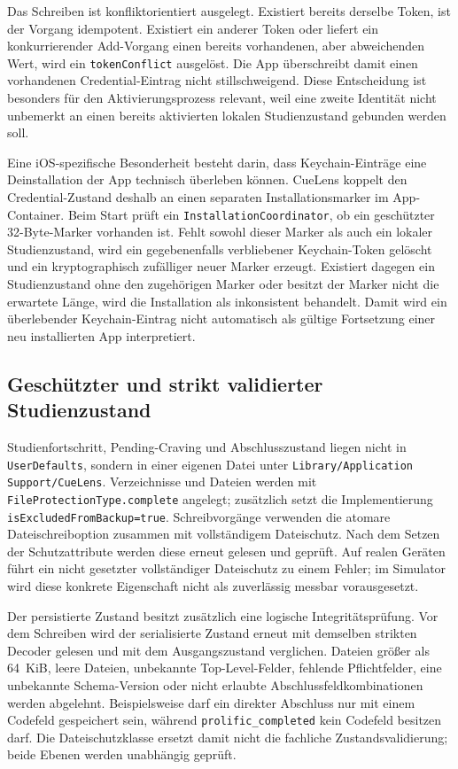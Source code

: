 \begin{neu}
Das Schreiben ist konfliktorientiert ausgelegt. Existiert bereits derselbe Token, ist der Vorgang idempotent. Existiert ein anderer Token oder liefert ein konkurrierender Add-Vorgang einen bereits vorhandenen, aber abweichenden Wert, wird ein \texttt{tokenConflict} ausgelöst. Die App überschreibt damit einen vorhandenen Credential-Eintrag nicht stillschweigend. Diese Entscheidung ist besonders für den Aktivierungsprozess relevant, weil eine zweite Identität nicht unbemerkt an einen bereits aktivierten lokalen Studienzustand gebunden werden soll.

Eine iOS-spezifische Besonderheit besteht darin, dass Keychain-Einträge eine Deinstallation der App technisch überleben können. CueLens koppelt den Credential-Zustand deshalb an einen separaten Installationsmarker im App-Container. Beim Start prüft ein \texttt{InstallationCoordinator}, ob ein geschützter 32-Byte-Marker vorhanden ist. Fehlt sowohl dieser Marker als auch ein lokaler Studienzustand, wird ein gegebenenfalls verbliebener Keychain-Token gelöscht und ein kryptographisch zufälliger neuer Marker erzeugt. Existiert dagegen ein Studienzustand ohne den zugehörigen Marker oder besitzt der Marker nicht die erwartete Länge, wird die Installation als inkonsistent behandelt. Damit wird ein überlebender Keychain-Eintrag nicht automatisch als gültige Fortsetzung einer neu installierten App interpretiert.

\subsection{Geschützter und strikt validierter Studienzustand}

Studienfortschritt, Pending-Craving und Abschlusszustand liegen nicht in \texttt{UserDefaults}, sondern in einer eigenen Datei unter \texttt{Library/Application Support/CueLens}. Verzeichnisse und Dateien werden mit \texttt{FileProtectionType.complete} angelegt; zusätzlich setzt die Implementierung \texttt{isExcludedFromBackup=true}. Schreibvorgänge verwenden die atomare Dateischreiboption zusammen mit vollständigem Dateischutz. Nach dem Setzen der Schutzattribute werden diese erneut gelesen und geprüft. Auf realen Geräten führt ein nicht gesetzter vollständiger Dateischutz zu einem Fehler; im Simulator wird diese konkrete Eigenschaft nicht als zuverlässig messbar vorausgesetzt.

Der persistierte Zustand besitzt zusätzlich eine logische Integritätsprüfung. Vor dem Schreiben wird der serialisierte Zustand erneut mit demselben strikten Decoder gelesen und mit dem Ausgangszustand verglichen. Dateien größer als 64~KiB, leere Dateien, unbekannte Top-Level-Felder, fehlende Pflichtfelder, eine unbekannte Schema-Version oder nicht erlaubte Abschlussfeldkombinationen werden abgelehnt. Beispielsweise darf ein direkter Abschluss nur mit einem Codefeld gespeichert sein, während \texttt{prolific\_completed} kein Codefeld besitzen darf. Die Dateischutzklasse ersetzt damit nicht die fachliche Zustandsvalidierung; beide Ebenen werden unabhängig geprüft.


\end{neu}
